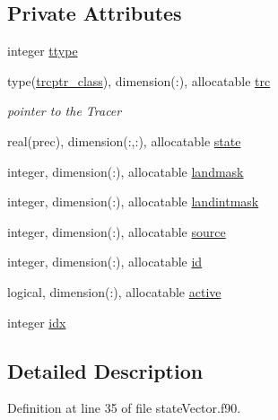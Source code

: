 \subsection*{Private Attributes}
\begin{DoxyCompactItemize}
\item 
integer \mbox{\hyperlink{structstatevector__mod_1_1statevector__class_a01e7628eb9959749a93b74a5bb21754c}{ttype}}
\item 
type(\mbox{\hyperlink{structstatevector__mod_1_1trcptr__class}{trcptr\+\_\+class}}), dimension(\+:), allocatable \mbox{\hyperlink{structstatevector__mod_1_1statevector__class_a510497a5645951832de30b8fd89a1d33}{trc}}
\begin{DoxyCompactList}\small\item\em pointer to the Tracer \end{DoxyCompactList}\item 
real(prec), dimension(\+:,\+:), allocatable \mbox{\hyperlink{structstatevector__mod_1_1statevector__class_a2934e9cc937ca318cbbe490dd391cf88}{state}}
\item 
integer, dimension(\+:), allocatable \mbox{\hyperlink{structstatevector__mod_1_1statevector__class_a1f66ab3f23eaa6cc8b4fd182d557fef8}{landmask}}
\item 
integer, dimension(\+:), allocatable \mbox{\hyperlink{structstatevector__mod_1_1statevector__class_ab6552971ecfec71ee3729c6e172c9bb8}{landintmask}}
\item 
integer, dimension(\+:), allocatable \mbox{\hyperlink{structstatevector__mod_1_1statevector__class_a26d6d27fd085846016d83c6e38781416}{source}}
\item 
integer, dimension(\+:), allocatable \mbox{\hyperlink{structstatevector__mod_1_1statevector__class_ae5b035e5a520de4f55c4b5ba6017f82c}{id}}
\item 
logical, dimension(\+:), allocatable \mbox{\hyperlink{structstatevector__mod_1_1statevector__class_a78ff040c3a087975ea448f9d1f7d7e1f}{active}}
\item 
integer \mbox{\hyperlink{structstatevector__mod_1_1statevector__class_a7cdf76beffd46644d2ebe4fff6b50b2e}{idx}}
\end{DoxyCompactItemize}


\subsection{Detailed Description}


Definition at line 35 of file state\+Vector.\+f90.



